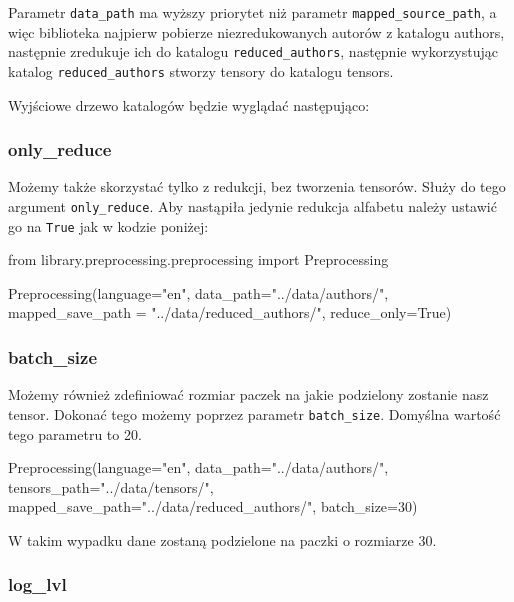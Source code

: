 Parametr \texttt{data\_path} ma wyższy priorytet niż parametr \texttt{mapped\_source\_path}, a więc biblioteka najpierw 
pobierze niezredukowanych autorów z katalogu authors, następnie zredukuje ich do katalogu \texttt{reduced\_authors},
następnie wykorzystując katalog \texttt{reduced\_authors} stworzy tensory do katalogu tensors.

Wyjściowe drzewo katalogów będzie wyglądać następująco:

\myspace
{}

\myspace

\subsubsection{only\_reduce}
Możemy także skorzystać tylko z redukcji, bez tworzenia tensorów. Służy do tego argument \texttt{only\_reduce}.
Aby nastąpiła jedynie redukcja alfabetu należy ustawić go na \texttt{True} jak w kodzie poniżej:

\begin{python}
from library.preprocessing.preprocessing import Preprocessing

Preprocessing(language="en",
              data_path="../data/authors/",
              mapped_save_path = "../data/reduced_authors/",
              reduce_only=True) 

\end{python}

\subsubsection{batch\_size}
Możemy również zdefiniować rozmiar paczek na jakie podzielony zostanie nasz tensor. Dokonać tego możemy poprzez
parametr \texttt{batch\_size}. Domyślna wartość tego parametru to 20.

\begin{python}
Preprocessing(language="en",
              data_path="../data/authors/",
              tensors_path="../data/tensors/",
              mapped_save_path="../data/reduced_authors/",
              batch_size=30)

\end{python}


W takim wypadku dane zostaną podzielone na paczki o rozmiarze 30.
\subsubsection{log\_lvl}

